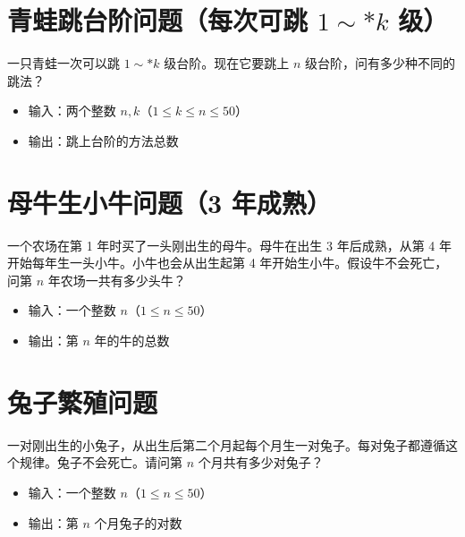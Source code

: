 \documentclass[11pt]{exam-zh}
\begin{document}
\begin{center}
\end{center}


\section{青蛙跳台阶问题（每次可跳 $1\sim* k$ 级）}
一只青蛙一次可以跳 $1\sim* k$ 级台阶。现在它要跳上 $n$ 级台阶，问有多少种不同的跳法？

\begin{itemize}[leftmargin=2em]
	\item 输入：两个整数 $n, k$（$1 \leq k \leq n \leq 50$）
	\item 输出：跳上台阶的方法总数
\end{itemize}

\begin{center}
	
\end{center}


\section{母牛生小牛问题（3 年成熟）}
一个农场在第 1 年时买了一头刚出生的母牛。母牛在出生 3 年后成熟，从第 4 年开始每年生一头小牛。小牛也会从出生起第 4 年开始生小牛。假设牛不会死亡，问第 $n$ 年农场一共有多少头牛？

\begin{itemize}[leftmargin=2em]
	\item 输入：一个整数 $n$（$1 \leq n \leq 50$）
	\item 输出：第 $n$ 年的牛的总数
\end{itemize}

\begin{center}
\end{center}



\section{兔子繁殖问题}
一对刚出生的小兔子，从出生后第二个月起每个月生一对兔子。每对兔子都遵循这个规律。兔子不会死亡。请问第 $n$ 个月共有多少对兔子？

\begin{itemize}[leftmargin=2em]
	\item 输入：一个整数 $n$（$1 \leq n \leq 50$）
	\item 输出：第 $n$ 个月兔子的对数
\end{itemize}
\end{document}
